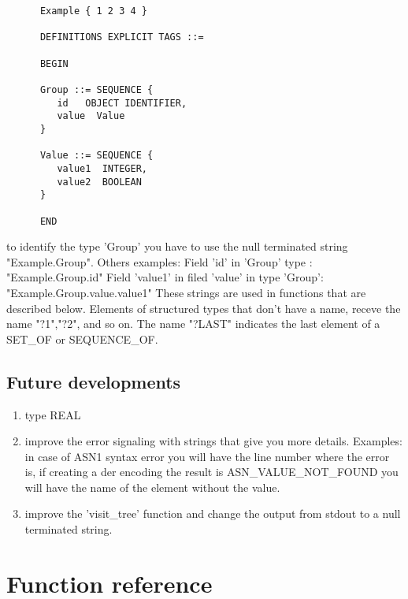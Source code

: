 \documentclass{book}
\begin{document}
\begin{verbatim}
      Example { 1 2 3 4 }

      DEFINITIONS EXPLICIT TAGS ::=

      BEGIN 

      Group ::= SEQUENCE {
         id   OBJECT IDENTIFIER,
         value  Value
      }

      Value ::= SEQUENCE {
         value1  INTEGER,
         value2  BOOLEAN 
      }

      END
\end{verbatim}

to identify the type 'Group' you have to use the null terminated string "Example.Group".
Others examples:
Field 'id' in 'Group' type :  "Example.Group.id"
Field 'value1' in filed 'value' in type 'Group':   "Example.Group.value.value1" 
These strings are used in functions that are described below.
Elements of structured types that don't have a name, receve the name "?1","?2", and so on. 
The name "?LAST" indicates the last element of a SET\_OF or SEQUENCE\_OF.

\section{Future developments}
\begin{enumerate}
\item type REAL 
\item improve the error signaling with strings that give you more details. 
   Examples: in case of ASN1 syntax error you will have the line number where the error is,  
             if creating a der encoding the result is ASN\_VALUE\_NOT\_FOUND you will have the
             name of the element without the value.
\item improve the 'visit\_tree' function and change the output from stdout to a null terminated 
   string.  

\end{enumerate}

\chapter{Function reference}



\end{document}
